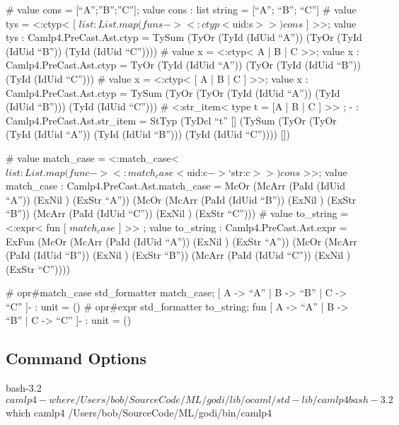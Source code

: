 \begin{ocamlcode}
# value cons = [``A'';''B'';''C''];
value cons : list string = [``A''; ``B''; ``C'']
# value tys = <:ctyp< [ $list: List.map (fun s -> <:ctyp< $uid:s$ >>)
cons $ ] >>;
value tys : Camlp4.PreCast.Ast.ctyp =
  TySum 
   (TyOr  (TyId  (IdUid  ``A''))
     (TyOr  (TyId  (IdUid  ``B'')) (TyId  (IdUid  ``C''))))
# value x  = <:ctyp< A | B | C >>;
value x : Camlp4.PreCast.Ast.ctyp =
  TyOr  (TyId  (IdUid  ``A''))
   (TyOr  (TyId  (IdUid  ``B'')) (TyId  (IdUid  ``C'')))
# value x  = <:ctyp< [ A | B | C ] >>;
value x : Camlp4.PreCast.Ast.ctyp =
  TySum 
   (TyOr  (TyOr  (TyId  (IdUid  ``A'')) (TyId  (IdUid  ``B'')))
   (TyId  (IdUid  ``C'')))
# <:str_item< type t = [A | B | C ] >> ;
- : Camlp4.PreCast.Ast.str_item =
StTyp 
 (TyDcl  ``t'' []
   (TySum 
     (TyOr  (TyOr  (TyId  (IdUid  ``A'')) (TyId  (IdUid  ``B'')))
       (TyId  (IdUid  ``C''))))
   [])
\end{ocamlcode}


\begin{ocamlcode}
# value match_case = <:match_case< $list: List.map (fun c ->
<:match_case< $uid:c$ -> $`str:c$ >>) cons$ >>;
value match_case : Camlp4.PreCast.Ast.match_case =
  McOr  (McArr  (PaId  (IdUid  ``A'')) (ExNil ) (ExStr  ``A''))
   (McOr  (McArr  (PaId  (IdUid  ``B'')) (ExNil ) (ExStr  ``B''))
     (McArr  (PaId  (IdUid  ``C'')) (ExNil ) (ExStr  ``C'')))
# value to_string = <:expr< fun [ $match_case$ ] >> ;
value to_string : Camlp4.PreCast.Ast.expr =
  ExFun 
   (McOr  (McArr  (PaId  (IdUid  ``A'')) (ExNil ) (ExStr  ``A''))
     (McOr  (McArr  (PaId  (IdUid  ``B'')) (ExNil ) (ExStr  ``B''))
       (McArr  (PaId  (IdUid  ``C'')) (ExNil ) (ExStr  ``C''))))
\end{ocamlcode}

\begin{ocamlcode}
# opr#match_case std_formatter match_case;
 [ A -> ``A'' | B -> ``B''
 | C -> ``C'' ]- : unit = ()
# opr#expr std_formatter to_string;
fun [ A -> ``A'' | B -> ``B'' | C -> ``C'' ]- : unit = ()
\end{ocamlcode}


  
\subsection{Command Options}

\begin{bashcode}
bash-3.2$ camlp4 -where
/Users/bob/SourceCode/ML/godi/lib/ocaml/std-lib/camlp4
bash-3.2$ which camlp4
/Users/bob/SourceCode/ML/godi/bin/camlp4
\end{bashcode}


